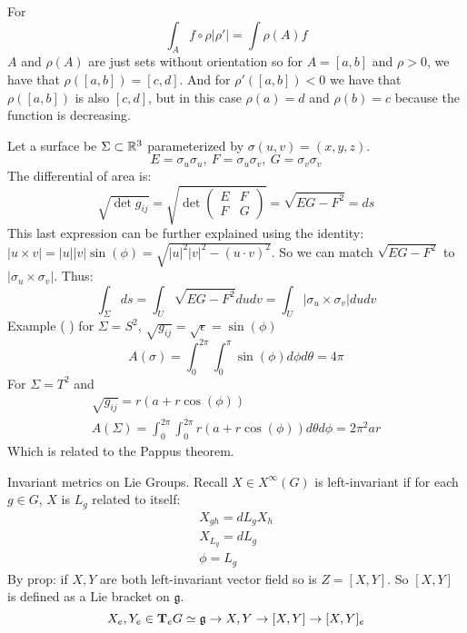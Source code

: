 For
$$\int_A f\circ \rho|\rho'| = \int{\rho(A)} f$$
$A$ and $\rho(A)$ are just sets without orientation so for $A= [a,b]$ and $\rho>0$, we have that $\rho([a,b]) = [c,d]$. And for $\rho'([a,b])<0$ we have that $\rho([a,b])$ is also $[c,d]$, but in this case $\rho(a) = d$ and $\rho(b) = c$ because the function is decreasing.

Let a surface be $\Sigma \subset \mathbb{R}^3$ parameterized by $\sigma(u,v)=(x,y,z)$.$$E=\sigma_u \sigma_u, \ F= \sigma_u \sigma_v, \ G = \sigma_v\sigma_v$$
The differential of area is:
$$\sqrt{\det g_{ij}} = \sqrt{\det \begin{pmatrix} E & F \\ F & G \end{pmatrix} } = \sqrt{EG-F^2}=ds$$
This last expression can be further explained using the identity:
$|u\times v|= |u||v|\sin(\phi)=\sqrt{|u|^2|v|^2 - (u\cdot v)^2}$. So we can match $\sqrt{EG-F^2} $ to $ |\sigma_u \times \sigma_v|$. Thus:
$$\int_\Sigma ds = \int_U\sqrt{EG-F^2} dudv = \int_U|\sigma_u\times \sigma_v|dudv$$
Example ( ) for $\Sigma= S^2$, $\sqrt{g_{ij}}=\sqrt{\epsilon} = \sin(\phi)$
$$A(\sigma) = \int_0^{2\pi} \int_0^\pi \sin(\phi) d\phi d\theta = 4\pi$$
For $\Sigma=T^2$ and 
\begin{gather*}
\sqrt{g_{ij}} = r(a+ r\cos(\phi))\\
A(\Sigma) = \int_0^{2\pi}\int_0^{2\pi} r(a+r\cos(\phi))d\theta d\phi = 2\pi^2ar
\end{gather*}
Which is related to the Pappus theorem.

Invariant metrics on Lie Groups. Recall $X\in X^\infty(G)$ is left-invariant if for each $g\in G$, $X$ is $L_g$ related to itself:
\begin{gather*}
X_{gh} = dL_gX_h\\
X_{L_g} = dL_g\\
\phi = L_g
\end{gather*}
By prop: if $X,Y$ are both left-invariant vector field so is $Z=[X,Y]$. So $[X,Y]$ is defined as a Lie bracket on $\mathfrak{g}$.
$$X_e,Y_e \in \text{\textbf{T}}_e G \simeq \mathfrak{g} \to X,Y \to [X,Y] \to [X,Y]_e$$ 

